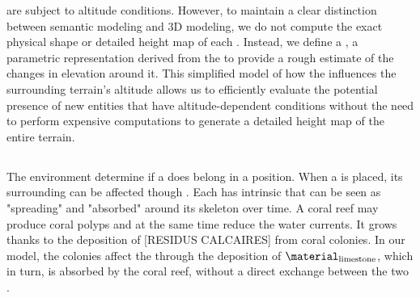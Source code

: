  are subject to altitude conditions. However, to maintain a clear distinction between semantic modeling and 3D modeling, we do not compute the exact physical shape or detailed height map of each . Instead, we define a , a parametric representation derived from the  to provide a rough estimate of the changes in elevation around it. This simplified model of how the  influences the surrounding terrain's altitude allows us to efficiently evaluate the potential presence of new entities that have altitude-dependent conditions without the need to perform expensive computations to generate a detailed height map of the entire terrain. 


\subsection{}
The environment determine if a  does belong in a position. When a  is placed, its surrounding  can be affected though . Each  has intrinsic  that can be seen as "spreading" and "absorbed" around its skeleton over time. A coral reef may produce coral polyps and at the same time reduce the water currents. It grows thanks to the deposition of [RESIDUS CALCAIRES] from coral colonies. In our model, the colonies affect the  through the deposition of  $\material_\text{limestone}$, which in turn, is absorbed by the coral reef, without a direct exchange between the two .

